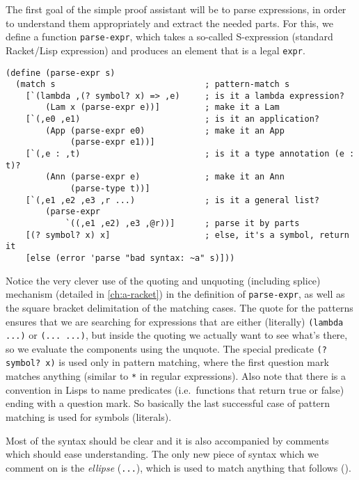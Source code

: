 The first goal of the simple proof assistant will be to parse expressions,
in order to understand them appropriately and extract the needed parts.
For this, we define a function \texttt{parse-expr}, which takes a so-called
S-expression (standard Racket/Lisp expression) and produces an element
that is a legal \texttt{expr}.
{
  \small
\begin{verbatim}
(define (parse-expr s)
  (match s                              ; pattern-match s
    [`(lambda ,(? symbol? x) => ,e)     ; is it a lambda expression?
        (Lam x (parse-expr e))]         ; make it a Lam
    [`(,e0 ,e1)                         ; is it an application?
        (App (parse-expr e0)            ; make it an App
             (parse-expr e1))]
    [`(,e : ,t)                         ; is it a type annotation (e : t)?
        (Ann (parse-expr e)             ; make it an Ann
             (parse-type t))]
    [`(,e1 ,e2 ,e3 ,r ...)              ; is it a general list?
        (parse-expr 
            `((,e1 ,e2) ,e3 ,@r))]      ; parse it by parts
    [(? symbol? x) x]                   ; else, it's a symbol, return it
    [else (error 'parse "bad syntax: ~a" s)]))
\end{verbatim}
}

Notice the very clever use of the quoting and unquoting (including splice)
mechanism (detailed in \ref{ch:a-racket}) in the definition of
\texttt{parse-expr}, as well as the square bracket delimitation of the matching
cases. The quote for the patterns ensures that
we are searching for expressions that are either (literally) \texttt{(lambda ...)}
or \texttt{(... ...)}, but inside the quoting we actually want to see
what's there, so we evaluate the components using the unquote.
The special predicate \texttt{(?\!\! symbol?\!\! x)} is used only in pattern
matching, where the first question mark matches anything (similar to
\texttt{*} in regular expressions). Also note that there is a convention
in Lisps to name predicates (i.e.\ functions that return true or false)
ending with a question mark. So basically the last successful case
of pattern matching is used for symbols (literals).

Most of the syntax should be clear and it is also accompanied by
comments which should ease understanding. The only new piece of syntax
which we comment on is the \emph{ellipse} (\texttt{...}), which is used
to match anything that follows ().

